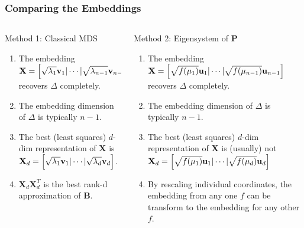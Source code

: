 \documentclass[professionalfonts, hyperref={pdfpagelabels=false,
  colorlinks=true, linkcolor=purple}]{beamer}
\begin{document}
\begin{frame}
 \frametitle{Comparing the Embeddings}
  \begin{columns}[t]
  \begin{column}{0.46\textwidth}
    Method 1: Classical MDS
    \vskip10pt
    \begin{enumerate}
    \item The embedding $\mathbf{X} = \Bigl[ \sqrt{\lambda_1} \mathbf{v}_1 |
        \cdots |
      \sqrt{\lambda_{n-1}} \mathbf{v}_{n-1} \Bigr]$ recovers
      $\Delta$ completely.
    \item The embedding dimension of $\Delta$
      is typically $n-1$.
    \item The best (least squares) $d$-dim representation of
      $\mathbf{X}$ is $\mathbf{X}_d =  \Bigl[ \sqrt{\lambda_1} \mathbf{v}_1 |
       \cdots |
      \sqrt{\lambda_d} \mathbf{v}_{d} \Bigr]$.
    \item $\mathbf{X}_d \mathbf{X}_d^{T}$ is the best
      rank-d approximation of $\mathbf{B}$.
    \end{enumerate}
  \end{column}
  
  \begin{column}{0.54\textwidth}
    Method 2: Eigensystem of $\mathbf{P}$
    \vskip10pt
    \begin{enumerate}
    \item The embedding 
      $\mathbf{X} = \Bigl[ \sqrt{f(\mu_1)} \mathbf{u}_1 |
       \cdots |
      \sqrt{f(\mu_{n-1})} \mathbf{u}_{n-1} \Bigr]$
      recovers 
      $\Delta$ completely.
    \item The embedding dimension of $\Delta$
     is typically $n-1$.
    \item The best (least squares) $d$-dim representation of
      $\mathbf{X}$ is (usually) \alert{not}
      $\mathbf{X}_d = \Bigl[ \sqrt{f(\mu_1)} \mathbf{u}_1 |
       \cdots |
      \sqrt{f(\mu_d)} \mathbf{u}_d \Bigr]$
   \item By rescaling individual coordinates, the embedding from any
     one $f$ can be transform to the embedding for any other $f$.
    \end{enumerate}
  \end{column}
\end{columns}
\end{frame}
\end{document}
